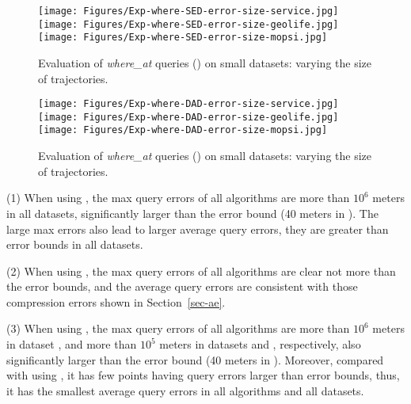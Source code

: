 {\begin{figure*}[tb!]
	\centering
	\texttt{[image: Figures/Exp-where-SED-error-size-service.jpg]} 	\hspace{0.5ex}
	\texttt{[image: Figures/Exp-where-SED-error-size-geolife.jpg]}	\hspace{0.5ex}
	\texttt{[image: Figures/Exp-where-SED-error-size-mopsi.jpg]}		
	\vspace{-2ex}
	\caption{\small Evaluation of {\emph{where\_at}} queries (\sed) on small datasets: varying the size of
		trajectories.}
	\label{fig:query-sed-size}
	\vspace{-1ex}
\end{figure*}


\begin{figure*}[tb!]
	\centering
	\texttt{[image: Figures/Exp-where-DAD-error-size-service.jpg]}	\hspace{0.5ex}
	\texttt{[image: Figures/Exp-where-DAD-error-size-geolife.jpg]}	\hspace{0.5ex}
	\texttt{[image: Figures/Exp-where-DAD-error-size-mopsi.jpg]}	
	\vspace{-2ex}
	\caption{\small Evaluation of {\emph{where\_at}} queries (\dad) on small datasets: varying the size of trajectories.}
	\label{fig:query-dad-size}
	\vspace{-1ex}
\end{figure*}




\ni (1) When using \ped, the max query errors of all algorithms are more than $10^6$ meters in all datasets, significantly larger than the error bound (40 meters in ). The large max errors also lead to larger average query errors, \ie they are greater than error bounds in all datasets.


\ni (2) When using \sed, the max query errors of all algorithms are clear not more than the error bounds, and the average query errors are consistent with those compression errors shown in Section~\ref{sec-ae}.


\ni (3) When using \dad, the max query errors of all algorithms are more than $10^6$ meters in dataset \ucar, and more than $10^5$ meters in datasets \geolife and \mopsi, respectively, also significantly larger than the error bound (40 meters in ). Moreover, compared with using \ped, it has few points having query errors larger than error bounds, thus, it has the smallest average query errors in all algorithms and all datasets.



}
